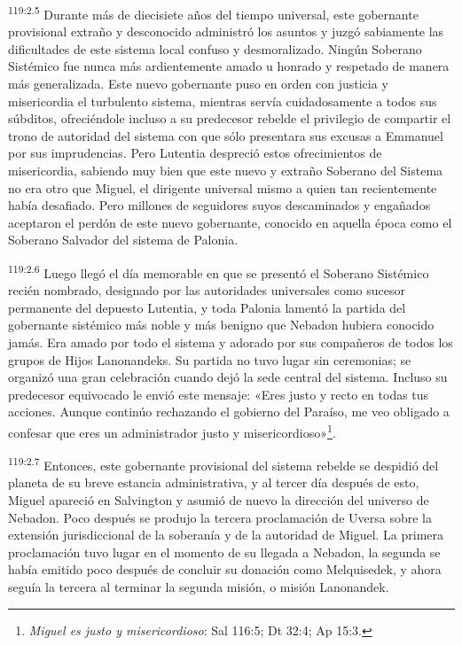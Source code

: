 \par
\textsuperscript{119:2.5} Durante más de diecisiete años del tiempo universal, este gobernante provisional extraño y desconocido administró los asuntos y juzgó sabiamente las dificultades de este sistema local confuso y desmoralizado. Ningún Soberano Sistémico fue nunca más ardientemente amado u honrado y respetado de manera más generalizada. Este nuevo gobernante puso en orden con justicia y misericordia el turbulento sistema, mientras servía cuidadosamente a todos sus súbditos, ofreciéndole incluso a su predecesor rebelde el privilegio de compartir el trono de autoridad del sistema con que sólo presentara sus excusas a Emmanuel por sus imprudencias. Pero Lutentia despreció estos ofrecimientos de misericordia, sabiendo muy bien que este nuevo y extraño Soberano del Sistema no era otro que Miguel, el dirigente universal mismo a quien tan recientemente había desafiado. Pero millones de seguidores suyos descaminados y engañados aceptaron el perdón de este nuevo gobernante, conocido en aquella época como el Soberano Salvador del sistema de Palonia.

\par
\textsuperscript{119:2.6} Luego llegó el día memorable en que se presentó el Soberano Sistémico recién nombrado, designado por las autoridades universales como sucesor permanente del depuesto Lutentia, y toda Palonia lamentó la partida del gobernante sistémico más noble y más benigno que Nebadon hubiera conocido jamás. Era amado por todo el sistema y adorado por sus compañeros de todos los grupos de Hijos Lanonandeks. Su partida no tuvo lugar sin ceremonias; se organizó una gran celebración cuando dejó la sede central del sistema. Incluso su predecesor equivocado le envió este mensaje: «Eres justo y recto en todas tus acciones. Aunque continúo rechazando el gobierno del Paraíso, me veo obligado a confesar que eres un administrador justo y misericordioso»\footnote{\textit{Miguel es justo y misericordioso}: Sal 116:5; Dt 32:4; Ap 15:3.}.

\par
\textsuperscript{119:2.7} Entonces, este gobernante provisional del sistema rebelde se despidió del planeta de su breve estancia administrativa, y al tercer día después de esto, Miguel apareció en Salvington y asumió de nuevo la dirección del universo de Nebadon. Poco después se produjo la tercera proclamación de Uversa sobre la extensión jurisdiccional de la soberanía y de la autoridad de Miguel. La primera proclamación tuvo lugar en el momento de su llegada a Nebadon, la segunda se había emitido poco después de concluir su donación como Melquisedek, y ahora seguía la tercera al terminar la segunda misión, o misión Lanonandek.


